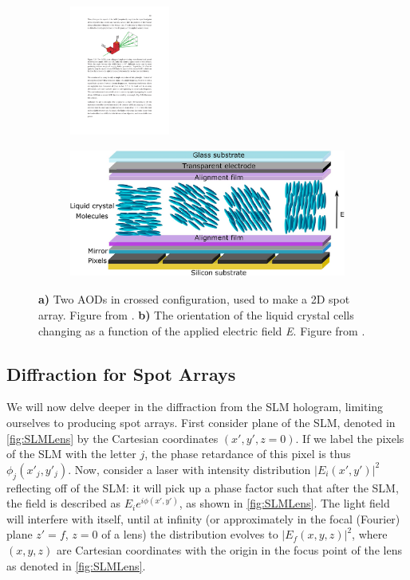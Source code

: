 \begin{figure}
	\begin{subfigure}{.39\textwidth}
		\includegraphics[height=4.25cm]{figures/crossAOD.pdf}
		\caption{}
		\label{fig:CrossAOD}
	\end{subfigure}
	\hfill
	\begin{subfigure}{.59\textwidth}
		\includegraphics[height=4.25cm]{figures/LCoS.png}
		\caption{}
		\label{fig:LCoS}
	\end{subfigure}
	\caption{\textbf{a)} Two \ac{AOD}s in crossed configuration, used to make a 2D spot array. Figure from \cite{Cooper2018}. 
	\textbf{b)} The orientation of the liquid crystal cells changing as a function of the applied electric field \textit{E}. 
	Figure from \cite{Guzman2017}.}
\end{figure}


\subsection{Diffraction for Spot Arrays}\label{sec:PropagationDerivation}

We will now delve deeper in the diffraction from the SLM hologram, limiting ourselves to producing spot arrays.
First consider plane of the SLM, denoted in \cref{fig:SLMLens} by the Cartesian coordinates $(x',y',z=0)$. 
If we label the pixels of the SLM with the letter $j$, the phase retardance of this pixel is thus $\phi_j(x'_j,y'_j)$.
Now, consider a laser with intensity distribution $|E_i(x',y')|^2$ reflecting off of the SLM: it will pick up a phase factor such that after the SLM, the field is described as $E_i e^{i\phi(x',y')}$, as shown in \cref{fig:SLMLens}. 
The light field will interfere with itself, until at infinity (or approximately in the focal (Fourier) plane $z'=f$, $z=0$ of a lens) the distribution evolves to $|E_f(x,y,z)|^2$, where $(x,y,z)$ are Cartesian coordinates with the origin in the focus point of the lens as denoted in \cref{fig:SLMLens}.

